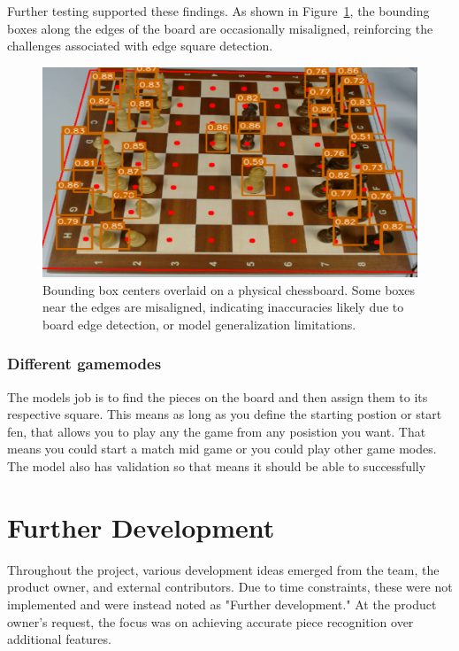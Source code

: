 Further testing supported these findings. As shown in Figure~\ref{fig:bbox-centers-incorrect}, the bounding boxes along the edges of the board are occasionally misaligned, reinforcing the challenges associated with edge square detection.

\begin{figure}[h!]
    \centering
    \includegraphics[width=0.75\linewidth]{figures/discussion/bbox-centers-incorrect.png}
    \caption{Bounding box centers overlaid on a physical chessboard. Some boxes near the edges are misaligned, indicating inaccuracies likely due to board edge detection, or model generalization limitations.}
    \label{fig:bbox-centers-incorrect}
\end{figure}



\subsubsection{Different gamemodes}

The models job is to find the pieces on the board and then assign them to its respective square. This means as long as you define the starting postion or start fen, that allows you to play any the game from any posistion you want. That means you could start a match mid game or you could play other game modes. The model also has validation so that means it should be able to successfully




\section{Further Development}
Throughout the project, various development ideas emerged from the team, the product owner, and external contributors. Due to time constraints, these were not implemented and were instead noted as "Further development." At the product owner's request, the focus was on achieving accurate piece recognition over additional features.


